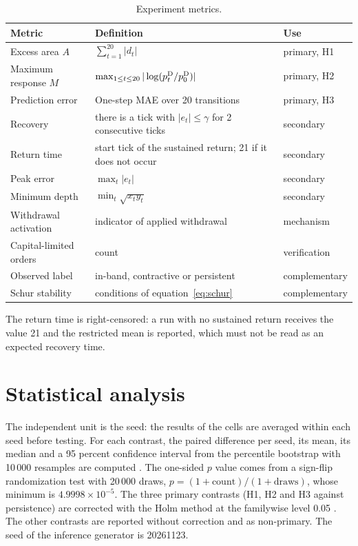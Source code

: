 \begin{table}[htbp]
\centering
\caption{Experiment metrics.}
\label{tab:metricas}
\small
\begin{tabularx}{\textwidth}{@{}l >{\raggedright\arraybackslash}X l@{}}
\toprule
Metric & Definition & Use \\
\midrule
Excess area $A$ & $\sum_{t=1}^{20}|d_t|$ & primary, H1 \\
Maximum response $M$ & $\max_{1\le t\le 20}|\log(p^{\mathrm{D}}_t/p^{\mathrm{D}}_0)|$ & primary, H2 \\
Prediction error & One-step MAE over 20 transitions & primary, H3 \\
Recovery & there is a tick with $|e_t|\le\gamma$ for 2 consecutive ticks & secondary \\
Return time & start tick of the sustained return; 21 if it does not occur & secondary \\
Peak error & $\max_t|e_t|$ & secondary \\
Minimum depth & $\min_t\sqrt{x_ty_t}$ & secondary \\
Withdrawal activation & indicator of applied withdrawal & mechanism \\
Capital-limited orders & count & verification \\
Observed label & in-band, contractive or persistent & complementary \\
Schur stability & conditions of equation~\eqref{eq:schur} & complementary \\
\bottomrule
\end{tabularx}
\end{table}

The return time is right-censored: a run with no sustained return receives the value 21 and the restricted mean is reported, which must not be read as an expected recovery time.

\section{Statistical analysis}
\label{sec:analisis-estadistico}

The independent unit is the seed: the results of the cells are averaged within each seed before testing. For each contrast, the paired difference per seed, its mean, its median and a 95 percent confidence interval from the percentile bootstrap with 10\,000 resamples are computed \cite{efron1979bootstrap}. The one-sided $p$ value comes from a sign-flip randomization test with 20\,000 draws, $p=(1+\text{count})/(1+\text{draws})$, whose minimum is $4.9998\times10^{-5}$. The three primary contrasts (H1, H2 and H3 against persistence) are corrected with the Holm method at the familywise level 0.05 \cite{holm1979simple}. The other contrasts are reported without correction and as non-primary. The seed of the inference generator is 20261123.

